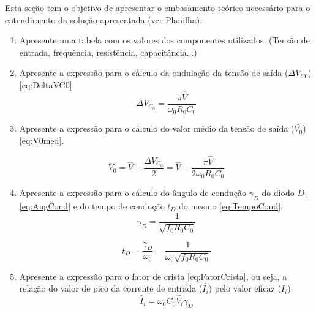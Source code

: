 Esta seção tem o objetivo de apresentar o embasamento teórico necessário para o entendimento da solução apresentada (ver Planilha). 
\begin{enumerate}	
	\item Apresente uma tabela com os valores dos componentes utilizados. (Tensão de entrada, frequência, resistência, capacitância...) 								
	\item  Apresente a expressão para o cálculo da ondulação da tensão de saída ($\Delta V_{C0}$) \eqref{eq:DeltaVC0}.
		\begin{equation}\label{eq:DeltaVC0}
		\Delta {V_{{C_0}}} = \frac{{\pi \hat V}}{{{\omega _0}{R_0}{C_0}}}
		\end{equation}
%
%	
	\item Apresente a expressão para o cálculo do valor médio da tensão de saída ($\bar{V_0}$) \eqref{eq:V0med}.
	
		\begin{equation}\label{eq:V0med}
	{\overline V _0} = \hat V - \frac{{\Delta {V_{{C_0}}}}}{2} = \hat V - \frac{{\pi \hat V}}{{2{\omega _0}{R_0}{C_0}}}
	\end{equation}
	
	\item  Apresente a expressão para o cálculo do ângulo de condução $\gamma_D$ do diodo $D_1$ \eqref{eq:AngCond} e do tempo de condução $t_D$ do mesmo \eqref{eq:TempoCond}.
	\begin{equation}\label{eq:AngCond}
	{\gamma _D} = \frac{1}{{\sqrt {{f_0}{R_0}{C_0}} }}
	\end{equation}
	
	\begin{equation}\label{eq:TempoCond}
	{t_D} = \frac{{{\gamma _D}}}{{{\omega _0}}} = \frac{1}{{{\omega _0}\sqrt {{f_0}{R_0}{C_0}} }}
	\end{equation}
		
	\item Apresente a expressão para o fator de crista \eqref{eq:FatorCrista}, ou seja, a relação do valor de pico da corrente de entrada ($\hat{I_i}$) pelo valor eficaz (${I_i}$).
	\begin{equation}\label{eq:Iipico}
	{{\hat I}_i } = {\omega _0}{C_0}{{\hat V}_i}{\gamma _D} 
	\end{equation}
	

\end{enumerate}
